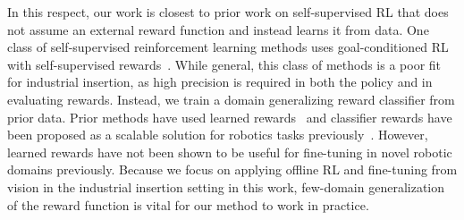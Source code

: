 In this respect, our work is closest to prior work on self-supervised RL that does not assume an external reward function and instead learns it from data.
One class of self-supervised reinforcement learning methods uses goal-conditioned RL with self-supervised rewards~\cite{kaelbling1993goals, schaul2015uva, Baranes2012, andrychowicz2017her, nair2018rig, nachum2018hiro, held2018goalgan, Pere2018, wadefarley2019discern, pong2020skewfit, khazatsky2021val}.
While general, this class of methods is a poor fit for industrial insertion, as high precision is required in both the policy and in evaluating rewards.
Instead, we train a domain generalizing reward classifier from prior data.
Prior methods have used learned rewards~\cite{pong2022smac} and classifier rewards have been proposed as a scalable solution for robotics tasks previously~\cite{fu2018vice, singh2019raq}.
However, learned rewards have not been shown to be useful for fine-tuning in novel robotic domains previously.
Because we focus on applying offline RL and fine-tuning from vision in the industrial insertion setting in this work, few-domain generalization of the reward function is vital for our method to work in practice.

